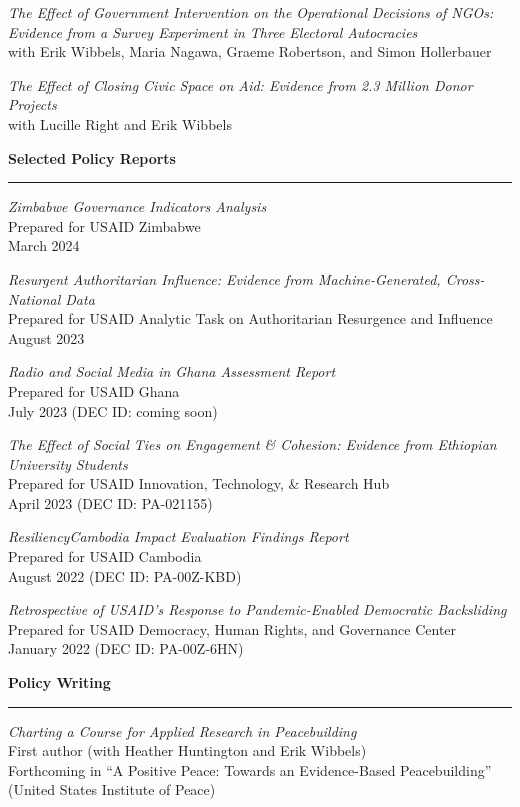 \documentclass[11pt]{article}
\begin{document}
{\sl The Effect of Government Intervention on the Operational Decisions of NGOs: Evidence from a Survey Experiment in Three Electoral Autocracies}\\
with Erik Wibbels, Maria Nagawa, Graeme Robertson, and Simon Hollerbauer

{\sl The Effect of Closing Civic Space on Aid: Evidence from 2.3 Million Donor Projects}\\
with Lucille Right and Erik Wibbels

\textbf{\large Selected Policy Reports}\\
\rule[3mm]{\textwidth}{.2pt}

{\sl Zimbabwe Governance Indicators Analysis}\\
Prepared for USAID Zimbabwe\\
March 2024

{\sl Resurgent Authoritarian Influence: Evidence from Machine-Generated, Cross-National Data}\\
Prepared for USAID Analytic Task on Authoritarian Resurgence and Influence\\
August 2023

{\sl Radio and Social Media in Ghana Assessment Report}\\
Prepared for USAID Ghana\\
July 2023 (DEC ID: coming soon)

{\sl The Effect of Social Ties on Engagement \& Cohesion: Evidence from Ethiopian University Students}\\
Prepared for USAID Innovation, Technology, \& Research Hub\\
April 2023 (DEC ID: PA-021155)

{\sl ResiliencyCambodia Impact Evaluation Findings Report}\\
Prepared for USAID Cambodia\\
August 2022 (DEC ID: PA-00Z-KBD)

{\sl  Retrospective of USAID’s Response to Pandemic-Enabled Democratic Backsliding}\\
Prepared for USAID Democracy, Human Rights, and Governance Center\\
January 2022 (DEC ID: PA-00Z-6HN)

\textbf{\large Policy Writing}\\
\rule[3mm]{\textwidth}{.2pt}
{\sl Charting a Course for Applied Research in Peacebuilding}\\
First author (with Heather Huntington and Erik Wibbels)\\
Forthcoming in ``A Positive Peace: Towards an Evidence-Based Peacebuilding'' (United States Institute of Peace)\\
\end{document}
